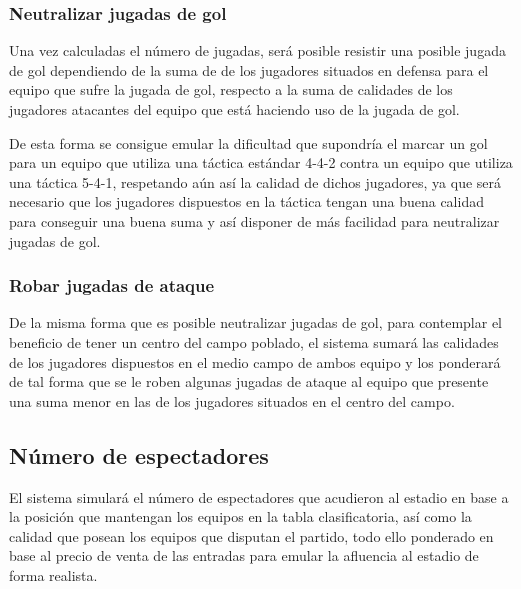 \subsubsection{Neutralizar jugadas de gol}
Una vez calculadas el número de jugadas, será posible resistir una posible
jugada de gol dependiendo de la suma de  de los
jugadores situados en defensa para el equipo que sufre la jugada de gol,
respecto a la suma de calidades  de los jugadores atacantes
del equipo que está haciendo uso de la jugada de gol.

De esta forma se consigue emular la dificultad que supondría el marcar un gol
para un equipo que utiliza una táctica estándar 4-4-2 contra un equipo que
utiliza una táctica 5-4-1, respetando aún así la calidad de dichos jugadores, ya
que será necesario que los jugadores dispuestos en la táctica tengan una buena
calidad para conseguir una buena suma y así disponer de más facilidad para
neutralizar jugadas de gol.

\subsubsection{Robar jugadas de ataque}
De la misma forma que es posible neutralizar jugadas de gol, para contemplar el
beneficio de tener un centro del campo poblado, el sistema sumará las calidades
de los jugadores dispuestos en el medio campo de ambos equipo y los ponderará de
tal forma que se le roben algunas jugadas de ataque al equipo que presente una
suma menor en las  de los jugadores situados en el
centro del campo.

\subsection{Número de espectadores}
El sistema simulará el número de espectadores que acudieron al estadio en base a
la posición que mantengan los equipos en la tabla clasificatoria, así como la
calidad que posean los equipos que disputan el partido, todo ello ponderado en
base al precio de venta de las entradas para emular la afluencia al estadio de
forma realista.

